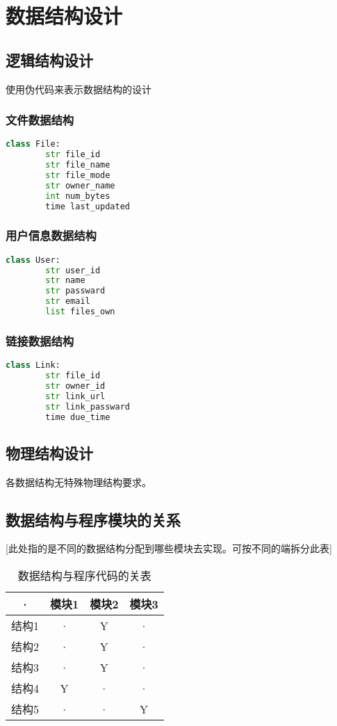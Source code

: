 \chapter{数据结构设计}

\section{逻辑结构设计}
使用伪代码来表示数据结构的设计
\subsection{文件数据结构}
\begin{lstlisting}[language=Python]
    class File:
        str file_id
        str file_name
        str file_mode
        str owner_name
        int num_bytes
        time last_updated
\end{lstlisting}

\subsection{用户信息数据结构}
\begin{lstlisting}[language=Python]
    class User:
        str user_id
        str name
        str passward
        str email
        list files_own

\end{lstlisting}
\subsection{链接数据结构}
\begin{lstlisting}[language=Python]
    class Link:
        str file_id
        str owner_id
        str link_url
        str link_passward
        time due_time

\end{lstlisting}

\section{物理结构设计}
各数据结构无特殊物理结构要求。

\section{数据结构与程序模块的关系}
[此处指的是不同的数据结构分配到哪些模块去实现。可按不同的端拆分此表]
\begin{table}[htbp]
\centering
\caption{数据结构与程序代码的关表} \label{tab:datastructure-module}
\begin{tabular}{|c|c|c|c|}
    \hline
    · & 模块1 & 模块2 & 模块3 \\
    \hline
    结构1 & · & Y & · \\
    \hline
    结构2 & · & Y & · \\
    \hline
    结构3 & · & Y & · \\
    \hline
    结构4 & Y & · & · \\
    \hline
    结构5 & · & · & Y \\
    \hline
\end{tabular}
\end{table}